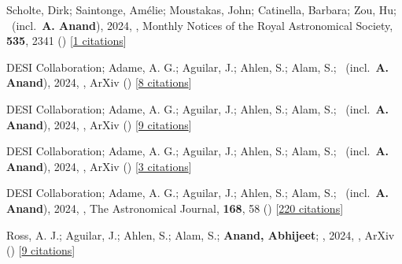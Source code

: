 \item[{\color{numcolor}\scriptsize11}] Scholte, Dirk; Saintonge, Am{\'e}lie; Moustakas, John; Catinella, Barbara; Zou, Hu; \etal\ (incl.\ \textbf{A. Anand}), 2024, , Monthly Notices of the Royal Astronomical Society, \textbf{535}, 2341 () [\href{https://ui.adsabs.harvard.edu/abs/2024MNRAS.535.2341S}{1 citations}]

\item[{\color{numcolor}\scriptsize10}] DESI Collaboration; Adame, A. G.; Aguilar, J.; Ahlen, S.; Alam, S.; \etal\ (incl.\ \textbf{A. Anand}), 2024, , ArXiv () [\href{https://ui.adsabs.harvard.edu/abs/2024arXiv241112021D}{8 citations}]

\item[{\color{numcolor}\scriptsize9}] DESI Collaboration; Adame, A. G.; Aguilar, J.; Ahlen, S.; Alam, S.; \etal\ (incl.\ \textbf{A. Anand}), 2024, , ArXiv () [\href{https://ui.adsabs.harvard.edu/abs/2024arXiv241112022D}{9 citations}]

\item[{\color{numcolor}\scriptsize8}] DESI Collaboration; Adame, A. G.; Aguilar, J.; Ahlen, S.; Alam, S.; \etal\ (incl.\ \textbf{A. Anand}), 2024, , ArXiv () [\href{https://ui.adsabs.harvard.edu/abs/2024arXiv241112020D}{3 citations}]

\item[{\color{numcolor}\scriptsize7}] DESI Collaboration; Adame, A. G.; Aguilar, J.; Ahlen, S.; Alam, S.; \etal\ (incl.\ \textbf{A. Anand}), 2024, , The Astronomical Journal, \textbf{168}, 58 () [\href{https://ui.adsabs.harvard.edu/abs/2024AJ....168...58D}{220 citations}]

\item[{\color{numcolor}\scriptsize6}] Ross, A. J.; Aguilar, J.; Ahlen, S.; Alam, S.; \textbf{Anand, Abhijeet}; \etal, 2024, , ArXiv () [\href{https://ui.adsabs.harvard.edu/abs/2024arXiv240516593R}{9 citations}]

